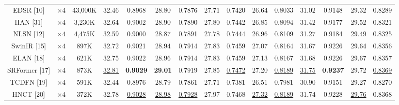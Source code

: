 \documentclass{ieeeaccess}
\begin{document}
\begin{table}
\begin{tabular}{|c|c|c|cc|cc|cc|cc|cc|cc|}
EDSR [10] & $\times4$ &43,000K& \multicolumn{1}{c|}{32.46} &0.8968& \multicolumn{1}{c|}{28.80} &0.7876 &\multicolumn{1}{c|}{27.71} &0.7420 & \multicolumn{1}{c|}{26.64 } & 0.8033 & \multicolumn{1}{c|}{31.02} & 0.9148
&\multicolumn{1}{c|}{29.32} &0.8289  \\

HAN [31] & $\times4$ &3,230K& \multicolumn{1}{c|}{32.64 } &0.9002 & \multicolumn{1}{c|}{28.90} &0.7890 &\multicolumn{1}{c|}{27.80} &0.7442& \multicolumn{1}{c|}{26.85} &0.8094 & \multicolumn{1}{c|}{31.42} &0.9177
&\multicolumn{1}{c|}{29.52} &0.8321 \\

NLSN [12] & $\times4$ &4,475K& \multicolumn{1}{c|}{32.59 } &0.9000 & \multicolumn{1}{c|}{28.87} &0.7891 &\multicolumn{1}{c|}{27.78} &0.7444 & \multicolumn{1}{c|}{26.96} &0.8109 & \multicolumn{1}{c|}{31.27} &0.9184
&\multicolumn{1}{c|}{29.49} &0.8325 \\

SwinIR [15] & $\times4$  &897K& \multicolumn{1}{c|}{32.72} &{0.9021} & \multicolumn{1}{c|}{28.94} &{0.7914}& \multicolumn{1}{c|}{27.83} &{0.7459} & \multicolumn{1}{c|}{27.07} &{0.8164}& \multicolumn{1}{c|}{31.67} &{0.9226} &\multicolumn{1}{c|}{29.64} &{0.8356}  \\


ELAN [18] & $\times 4$ &621K& \multicolumn{1}{c|}{32.75} & 0.9022 & \multicolumn{1}{c|}{28.96} & 0.7914 & \multicolumn{1}{c|}{27.83} & 0.7459 & \multicolumn{1}{c|}{27.13} &0.8167 & \multicolumn{1}{c|}{31.68} & 0.9226 &\multicolumn{1}{c|}{29.67} & 0.8357\\

SRFormer [17] & $\times 4$ &873K& \multicolumn{1}{c|}{\color{blue}\underline{32.81}} & {\color{red}\textbf{0.9029}} & \multicolumn{1}{c|}{\color{red}\textbf{29.01}} &{ 0.7919} & \multicolumn{1}{c|}{27.85} & {\color{blue}\underline{0.7472}} & \multicolumn{1}{c|}{27.20} & {\color{blue}\underline{0.8189}} & \multicolumn{1}{c|}{\color{blue}\underline{31.75}} &{\color{red}\textbf{0.9237}} &\multicolumn{1}{c|}{29.72} & {\color{blue}\underline{ 0.8369}}\\

TCDFN [19] & $\times 4$ &591K& \multicolumn{1}{c|}{32.44} & 0.8976 & \multicolumn{1}{c|}{28.79} & 0.7861 & \multicolumn{1}{c|}{27.71} & 0.7381 & \multicolumn{1}{c|}{26.51} &0.7981 & \multicolumn{1}{c|}{30.90} & 0.9151 &\multicolumn{1}{c|}{29.27} & 0.8270\\

HNCT [20] & $\times 4$ &372K& \multicolumn{1}{c|}{32.78} & {\color{blue}\underline{0.9028}} & \multicolumn{1}{c|}{\color{blue}\underline{28.98}} & {\color{blue}\underline{0.7928}} & \multicolumn{1}{c|}{27.97} & 0.7468 & \multicolumn{1}{c|}{\color{blue}\underline{27.32}} &{\color{blue}\underline{0.8189}} & \multicolumn{1}{c|}{31.74} & 0.9228 &\multicolumn{1}{c|}{\color{blue}\underline{29.76}} & 0.8368\\


\end{tabular}
\end{table}
\end{document}
